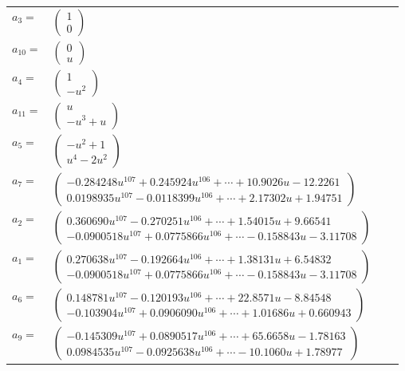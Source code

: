 \documentclass[1p]{elsarticle_modified}
\theoremstyle{definition}
\begin{document}
\begin{tabular}{m{7pt} m{180pt} m{7pt} m{180pt} }
\flushright $a_{3}=$&$\begin{pmatrix}1\\0\end{pmatrix}$ \\
\flushright $a_{10}=$&$\begin{pmatrix}0\\u\end{pmatrix}$ \\
\flushright $a_{4}=$&$\begin{pmatrix}1\\- u^2\end{pmatrix}$ \\
\flushright $a_{11}=$&$\begin{pmatrix}u\\- u^3+u\end{pmatrix}$ \\
\flushright $a_{5}=$&$\begin{pmatrix}- u^2+1\\u^4-2 u^2\end{pmatrix}$ \\
\flushright $a_{7}=$&$\begin{pmatrix}-0.284248 u^{107}+0.245924 u^{106}+\cdots+10.9026 u-12.2261\\0.0198935 u^{107}-0.0118399 u^{106}+\cdots+2.17302 u+1.94751\end{pmatrix}$ \\
\flushright $a_{2}=$&$\begin{pmatrix}0.360690 u^{107}-0.270251 u^{106}+\cdots+1.54015 u+9.66541\\-0.0900518 u^{107}+0.0775866 u^{106}+\cdots-0.158843 u-3.11708\end{pmatrix}$ \\
\flushright $a_{1}=$&$\begin{pmatrix}0.270638 u^{107}-0.192664 u^{106}+\cdots+1.38131 u+6.54832\\-0.0900518 u^{107}+0.0775866 u^{106}+\cdots-0.158843 u-3.11708\end{pmatrix}$ \\
\flushright $a_{6}=$&$\begin{pmatrix}0.148781 u^{107}-0.120193 u^{106}+\cdots+22.8571 u-8.84548\\-0.103904 u^{107}+0.0906090 u^{106}+\cdots+1.01686 u+0.660943\end{pmatrix}$ \\
\flushright $a_{9}=$&$\begin{pmatrix}-0.145309 u^{107}+0.0890517 u^{106}+\cdots+65.6658 u-1.78163\\0.0984535 u^{107}-0.0925638 u^{106}+\cdots-10.1060 u+1.78977\end{pmatrix}$ \\

\end{tabular}
\end{document}
